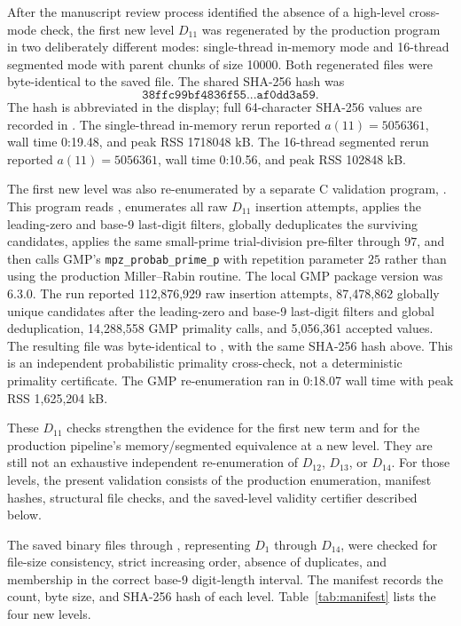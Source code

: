 \documentclass[11pt]{article}
\theoremstyle{definition}
\theoremstyle{remark}
\begin{document}
After the manuscript review process identified the absence of a high-level
cross-mode check, the first new level \(D_{11}\) was regenerated by the
production program in two deliberately different modes: single-thread
in-memory mode and 16-thread segmented mode with parent chunks of size
10000.  Both regenerated files were byte-identical to the saved
 file.  The shared SHA-256 hash was
\[
\texttt{38ffc99bf4836f55...af0dd3a59}.
\]
The hash is abbreviated in the display; full 64-character SHA-256 values are
recorded in .
The single-thread in-memory rerun reported \(a(11)=5056361\), wall time
0:19.48, and peak RSS 1718048 kB.  The 16-thread segmented rerun reported
\(a(11)=5056361\), wall time 0:10.56, and peak RSS 102848 kB.

The first new level was also re-enumerated by a separate C validation
program, .  This program reads
, enumerates all raw \(D_{11}\) insertion attempts,
applies the leading-zero and base-9 last-digit filters, globally
deduplicates the surviving candidates, applies the same small-prime
trial-division pre-filter through \(97\), and then calls GMP's
\texttt{mpz\_probab\_prime\_p} with repetition parameter \(25\) rather than
using the production Miller--Rabin routine.  The local GMP package version
was 6.3.0.  The run reported 112,876,929 raw insertion attempts, 87,478,862
globally unique candidates after the leading-zero and base-9 last-digit
filters and global deduplication, 14,288,558 GMP primality calls, and
5,056,361 accepted values.  The resulting  file was byte-identical
to , with the same SHA-256 hash above.  This is an
independent probabilistic primality cross-check, not a deterministic
primality certificate.  The GMP re-enumeration ran in 0:18.07 wall time with
peak RSS 1,625,204 kB.

These \(D_{11}\) checks strengthen the evidence for the first new term and
for the production pipeline's memory/segmented equivalence at a new level.
They are still not an exhaustive independent re-enumeration of
\(D_{12}\), \(D_{13}\), or \(D_{14}\).  For those levels, the present
validation consists of the production enumeration, manifest hashes, structural
file checks, and the saved-level validity certifier described below.

The saved binary files  through ,
representing \(D_1\) through \(D_{14}\), were checked for file-size
consistency, strict increasing order, absence of duplicates, and membership
in the correct base-9 digit-length interval.  The manifest records the count,
byte size, and SHA-256 hash of each level.  Table~\ref{tab:manifest} lists
the four new levels.
\end{document}
